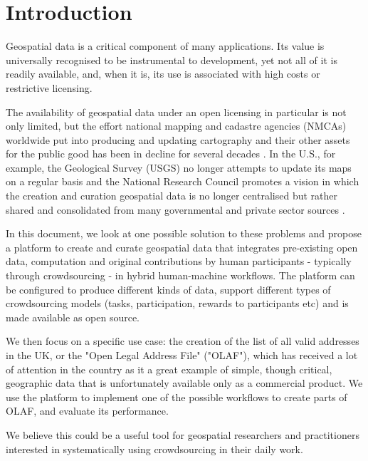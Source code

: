 \section{Introduction}

Geospatial data is a critical component of many applications. Its value is universally recognised to be instrumental to development, yet not all of it is readily available, and, when it is, its use is associated with high costs or restrictive licensing. 

The availability of geospatial data under an open licensing in particular is not only limited, but the effort national mapping and cadastre agencies (NMCAs) worldwide put into producing and updating cartography and their other assets for the public good has been in decline for several decades \cite{ESTES:1994vz}. In the U.S., for example, the Geological Survey (USGS) no longer attempts to update its maps on a regular basis and the National Research Council promotes a vision in which the creation and curation geospatial data is no longer centralised but rather shared and consolidated from many governmental and private sector sources \cite{Committee:1993vp}.

In this document, we look at one possible solution to these problems and propose a platform to create and curate geospatial data that integrates pre-existing open data, computation and original contributions by human participants - typically through crowdsourcing - in hybrid human-machine workflows. The platform can be configured to produce different kinds of data, support different types of crowdsourcing models (tasks, participation, rewards to participants etc) and is made available as open source.

We then focus on a specific use case: the creation of the list of all valid addresses in the UK, or the "Open Legal Address File" ("OLAF"), which has received a lot of attention in the country as it a great example of simple, though critical, geographic data that is unfortunately available only as a commercial product. We use the platform to implement one of the possible workflows to create parts of OLAF, and evaluate its performance. 

We believe this could be a useful tool for geospatial researchers and practitioners interested in systematically using crowdsourcing in their daily work.
